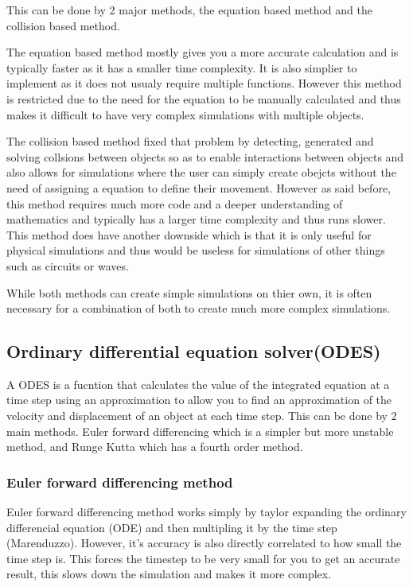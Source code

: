\documentclass[12pt, a2paper]{article}
\begin{document}
This can be done by 2 major methods, the equation based method and the collision based method.

The equation based method mostly gives you a more accurate calculation and is typically faster as it has a smaller time complexity. It is also simplier to implement as it does not usualy require multiple functions. However this method is restricted due to the need for the equation to be manually calculated and thus makes it difficult to have very complex simulations with multiple objects.

The collision based method fixed that problem by detecting, generated and solving collsions between objects so as to enable interactions between objects and also allows for simulations where the user can simply create obejcts without the need of assigning a equation to define their movement. However as said before, this method requires much more code and a deeper understanding of mathematics and typically has a larger time complexity and thus runs slower. This method does have another downside which is that it is only useful for physical simulations and thus would be useless for simulations of other things such as circuits or waves.

While both methods can create simple simulations on thier own, it is often necessary for a combination of both to create much more complex simulations.

\subsection{Ordinary differential equation solver(ODES)}
A ODES is a fucntion that calculates the value of the integrated equation at a time step using an approximation to allow you to find an approximation of the velocity and displacement of an object at each time step. This can be done by 2 main methods. Euler forward differencing which is a simpler but more unstable method, and Runge Kutta which has a fourth order method. 

\subsubsection{Euler forward differencing method}
Euler forward differencing method works simply by taylor expanding the ordinary differencial equation (ODE) and then multipling it by the time step (Marenduzzo). However, it's accuracy is also directly correlated to how small the time step is. This forces the timestep to be very small for you to get an accurate result, this slows down the simulation and makes it more complex. 
\end{document}
